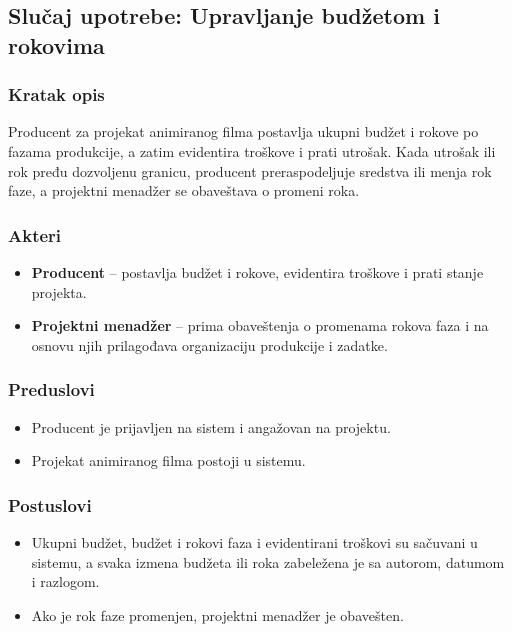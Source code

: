 \subsection{Slučaj upotrebe: Upravljanje budžetom i rokovima}

\subsubsection*{Kratak opis}

Producent za projekat animiranog filma postavlja ukupni budžet i rokove po fazama produkcije, a zatim evidentira troškove i prati utrošak. Kada utrošak ili rok pređu dozvoljenu granicu, producent preraspodeljuje sredstva ili menja rok faze, a projektni menadžer se obaveštava o promeni roka.

\subsubsection*{Akteri}
\begin{itemize}
    \item \textbf{Producent} -- postavlja budžet i rokove, evidentira troškove i prati stanje projekta.
    \item \textbf{Projektni menadžer} -- prima obaveštenja o promenama rokova faza i na osnovu njih prilagođava organizaciju produkcije i zadatke.
\end{itemize}

\subsubsection*{Preduslovi}
\begin{itemize}
    \item Producent je prijavljen na sistem i angažovan na projektu.
    \item Projekat animiranog filma postoji u sistemu.
\end{itemize}

\subsubsection*{Postuslovi}
\begin{itemize}
    \item Ukupni budžet, budžet i rokovi faza i evidentirani troškovi su sačuvani u sistemu, a svaka izmena budžeta ili roka zabeležena je sa autorom, datumom i razlogom.
    \item Ako je rok faze promenjen, projektni menadžer je obavešten.
\end{itemize}

